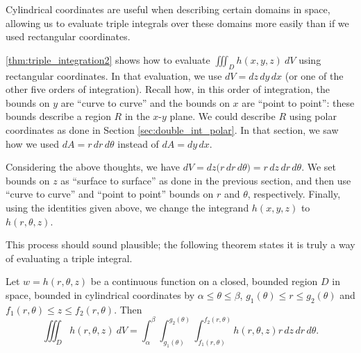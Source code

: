 Cylindrical coordinates are useful when describing certain domains in space, allowing us to evaluate triple integrals over these domains more easily than if we used rectangular coordinates.

\autoref{thm:triple_integration2} shows how to evaluate $\iiint_Dh(x,y,z)\ dV$ using rectangular coordinates. In that evaluation, we use $dV = dz\,dy\,dx$ (or one of the other five orders of integration). Recall how, in this order of integration, the bounds on $y$ are ``curve to curve'' and the bounds on $x$ are ``point to point'': these bounds describe a region $R$ in the $x$-$y$ plane. We could describe $R$ using polar coordinates as done in Section \ref{sec:double_int_polar}. In that section, we saw how we used $dA = r\,dr\,d\theta$ instead of $dA = dy\,dx$. 

Considering the above thoughts, we have $dV = dz\big(r\,dr\,d\theta\big) = r\,dz\,dr\,d\theta$. We set bounds on $z$ as ``surface to surface'' as done in the previous section, and then use ``curve to curve'' and ``point to point'' bounds on $r$ and $\theta$, respectively. Finally, using the identities given above, we change the integrand $h(x,y,z)$ to $h(r,\theta,z)$.

This process should sound plausible; the following theorem states it is truly a way of evaluating a triple integral.

{%
Let $w=h(r,\theta,z)$ be a continuous function on a closed, bounded region $D$ in space, bounded in cylindrical coordinates by $\alpha \leq \theta \leq \beta$, $g_1(\theta)\leq r \leq g_2(\theta)$ and $f_1(r,\theta) \leq z \leq f_2(r,\theta)$. Then  
\[
\iiint_D h(r,\theta,z)\ dV = \int_\alpha^\beta\int_{g_1(\theta)}^{g_2(\theta)}\int_{f_1(r,\theta)}^{f_2(r,\theta)}h(r,\theta,z) r\,dz\,dr\,d\theta.
\]}

